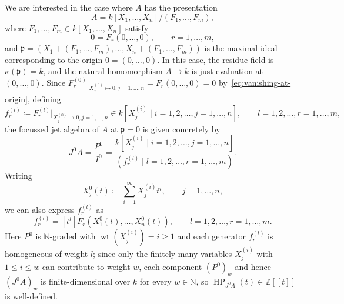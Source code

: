 \documentclass[a4paper, 12pt, reqno]{amsart}
\theoremstyle{remark}
\begin{document}
We are interested in the case where $A$ has the presentation
\begin{equation}
  \label{eq:finite-presentation}
  A = k[X_1, \dots, X_n]/(F_1, \dots, F_m),
\end{equation}
where $F_1, \dots, F_m \in k[X_1, \dots, X_n]$ satisfy
\begin{equation}
  \label{eq:vanishing-at-origin}
  0 = F_r(0, \dots, 0), \qquad r = 1, \dots, m,
\end{equation}
and $\mathfrak{p} = (X_1 + (F_1, \dots, F_m), \dots, X_n + (F_1, \dots, F_m))$ is the maximal ideal corresponding to the origin $0 = (0, \dots, 0)$.
In this case, the residue field is $\kappa(\mathfrak{p}) = k$, and the natural homomorphism $A \to k$ is just evaluation at $(0, \dots, 0)$.
Since $F_r^{(0)}|_{X^{(0)}_j \mapsto 0, j = 1, \dots, n} = F_r(0, \dots, 0) = 0$ by~\eqref{eq:vanishing-at-origin},
defining
\begin{equation}
  \label{eq:focussed-jet-generators}
  f^{(l)}_r \coloneq F_r^{(l)}|_{X^{(0)}_j \mapsto 0, j = 1, \dots, n} \in k[X^{(i)}_j \mid i = 1, 2, \dots, j = 1, \dots, n], \qquad l = 1, 2, \dots, r = 1, \dots, m,
\end{equation}
the focussed jet algebra of $A$ at $\mathfrak{p} = 0$ is given concretely by
\begin{equation*}
  J^0 A = \frac{P^0}{I^0} = \frac{k[X^{(i)}_j \mid i = 1, 2, \dots, j = 1, \dots, n]}{(f^{(l)}_r \mid l = 1, 2, \dots, r = 1, \dots, m)}.
\end{equation*}
Writing
\begin{equation*}
  X^0_j(t) \coloneq \sum_{i = 1}^\infty X_j^{(i)}t^i, \qquad j = 1, \dots, n,
\end{equation*}
we can also express $f^{(l)}_r$ as
\begin{equation*}
  f^{(l)}_r = [t^l]F_r(X^0_1(t), \dots, X^0_n(t)), \qquad l = 1, 2, \dots, r = 1, \dots, m.
\end{equation*}
Here $P^0$ is $\mathbb{N}$-graded with $\operatorname{wt}(X_j^{(i)}) = i \ge 1$ and each generator $f^{(l)}_r$ is homogeneous of weight $l$;
since only the finitely many variables $X_j^{(i)}$ with $1 \le i \le w$ can contribute to weight $w$,
each component $(P^0)_w$ and hence $(J^0 A)_w$ is finite-dimensional over $k$ for every $w \in \mathbb{N}$,
so $\operatorname{HP}_{J^0 A}(t) \in \mathbb{Z}[[t]]$ is well-defined.
\end{document}
